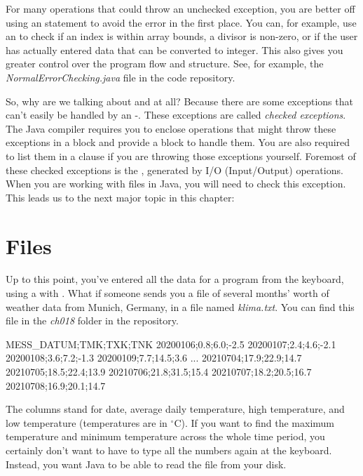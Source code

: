 For many operations that could throw an unchecked exception, you are better off using an  statement to avoid the error in the first place. You can, for example, use an  to check if an index is within array bounds, a divisor is non-zero, or if the user has actually entered data that can be converted to integer. This also gives you greater control over the program flow and structure. See, for example, the {\it NormalErrorChecking.java} file in the code repository.


So, why are we talking about  and  at all? Because there are some exceptions that can't easily be handled by an -. These exceptions are called {\em checked exceptions}. The Java compiler requires you to enclose operations that might throw these exceptions in a  block and provide a  block to handle them. You are also required to list them in a  clause if you are throwing those exceptions yourself. Foremost of these checked exceptions is the , generated by I/O (Input/Output) operations. When you are working with files in Java, you will need to check this exception. This leads us to the next major topic in this chapter:

\section{Files}

Up to this point, you've entered all the data for a program from the keyboard, using a  with .  What if someone sends you a file of several months' worth of weather data from Munich, Germany, in a file named {\em klima.txt}. You can find this file in the {\em ch018} folder in the repository\footnotemark.


\begin{stdout}
MESS_DATUM;TMK;TXK;TNK
20200106;0.8;6.0;-2.5
20200107;2.4;4.6;-2.1
20200108;3.6;7.2;-1.3
20200109;7.7;14.5;3.6
...
20210704;17.9;22.9;14.7
20210705;18.5;22.4;13.9
20210706;21.8;31.5;15.4
20210707;18.2;20.5;16.7
20210708;16.9;20.1;14.7
\end{stdout}

The columns stand for date, average daily temperature, high temperature, and low temperature (temperatures are in $^\circ$C).
If you want to find the maximum temperature and minimum temperature across the whole time period, you certainly don't want to have to type all the numbers again at the keyboard. Instead, you want Java to be able to read the file from your disk.

